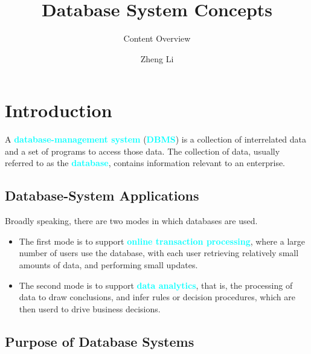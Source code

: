 \documentclass{Beautybook-EN}
\newcommand{\textcy}[1]{\textbf{\textcolor{cyan}{#1}}}
\begin{document}
\thispagestyle{empty}
\title{Database System Concepts}
\subtitle{Content Overview}
\author{Zheng Li}
\makecover
{}
\oddoutermargin{\cabin\leftmark}
\makeatletter
\evenoutermargin{\cabin\@title}
\setlength\footheight{20pt}
\ofoot{}
\makeatother

\frontmatter
{}
\thispagestyle{empty}
\tableofcontents\let\cleardoublepage\clearpage
\mainmatter
{}
\chapter{Introduction}

A \textcy{database-management system} (\textcy{DBMS}) is a collection of interrelated data and a set of programs to access those data. The collection of data, usually referred to as the \textcy{database}, contains information relevant to an enterprise.

\section{Database-System Applications}

Broadly speaking, there are two modes in which databases are used.
\begin{itemize}
    \item The first mode is to support \textcy{online transaction processing}, where a large number of users use the database, with each user retrieving relatively small amounts of data, and performing small updates.
    \item The second mode is to support \textcy{data analytics}, that is, the processing of data to draw conclusions, and infer rules or decision procedures, which are then userd to drive business decisions.
\end{itemize}

\section{Purpose of Database Systems}
\end{document}
